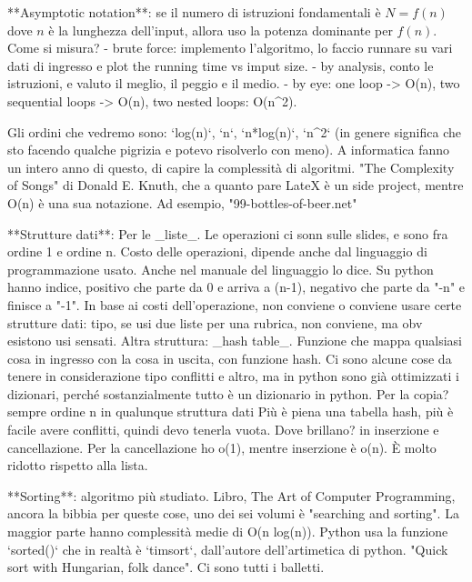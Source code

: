 \documentclass[10pt, a4paper, twosided, titlepage, draft]{book}
\begin{document}
**Asymptotic notation**: se il numero di istruzioni fondamentali è $N=f(n)$ dove $n$ è la lunghezza dell'input, allora uso la potenza dominante per $f(n)$.
Come si misura? 
- brute force: implemento l'algoritmo, lo faccio runnare su vari dati di ingresso e plot the running time vs imput size.
- by analysis, conto le istruzioni, e valuto il meglio, il peggio e il medio.
- by eye: one loop -> O(n), two sequential loops -> O(n), two nested loops: O(n^2).

Gli ordini che vedremo sono: `log(n)`, `n`, `n*log(n)`, `n^2` (in genere significa che sto facendo qualche pigrizia e potevo risolverlo con meno).
A informatica fanno un intero anno di questo, di capire la complessità di algoritmi.
"The Complexity of Songs" di Donald E. Knuth, che a quanto pare LateX è un side project, mentre O(n) è una sua notazione. Ad esempio, "99-bottles-of-beer.net"

**Strutture dati**: Per le _liste_. Le operazioni ci sonn sulle slides, e sono fra ordine 1 e ordine n. Costo delle operazioni, dipende anche dal linguaggio di programmazione usato. Anche nel manuale del linguaggio lo dice.
Su python hanno indice, positivo che parte da 0 e arriva a (n-1), negativo che parte da "-n" e finisce a "-1". 
In base ai costi dell'operazione, non conviene o conviene usare certe strutture dati: tipo, se usi due liste per una rubrica, non conviene, ma obv esistono usi sensati.
Altra struttura: _hash table_. Funzione che mappa qualsiasi cosa in ingresso con la cosa in uscita, con funzione hash. Ci sono alcune cose da tenere in considerazione tipo conflitti e altro, ma in python sono già ottimizzati i dizionari, perché sostanzialmente tutto è un dizionario in python.
Per la copia? sempre ordine n in qualunque struttura dati
Più è piena una tabella hash, più è facile avere conflitti, quindi devo tenerla vuota. Dove brillano? in inserzione e cancellazione. Per la cancellazione ho o(1), mentre inserzione è o(n). È molto ridotto rispetto alla lista.

**Sorting**: algoritmo più studiato. Libro, The Art of Computer Programming, ancora la bibbia per queste cose, uno dei sei volumi è "searching and sorting".
La maggior parte hanno complessità medie di O(n log(n)). Python usa la funzione `sorted()` che in realtà è `timsort`, dall'autore dell'artimetica di python.
"Quick sort with Hungarian, folk dance". Ci sono tutti i balletti.
\end{document}
